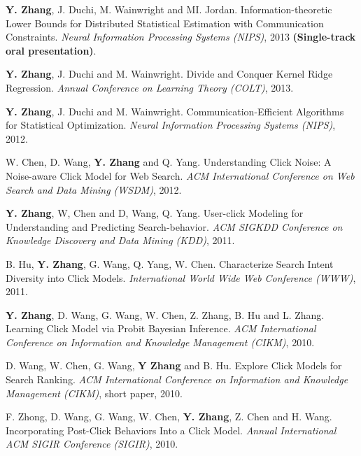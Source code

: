 \documentclass{res} %
\begin{document}
\begin{resume}
\begin{enumerate}[label={[C\arabic*]}, ref={C\arabic*}]
\item \textbf{Y. Zhang}, J. Duchi, M. Wainwright and MI. Jordan. Information-theoretic Lower Bounds for Distributed Statistical Estimation with Communication Constraints.
\emph{Neural Information Processing Systems (NIPS)}, 2013 {\bf (Single-track oral presentation)}. \label{information-nips13}

\item  \textbf{Y. Zhang}, J. Duchi and M. Wainwright. Divide and Conquer Kernel Ridge Regression.
\emph{Annual Conference on Learning Theory (COLT)}, 2013. \label{divide-colt13}

\item  \textbf{Y. Zhang}, J. Duchi and M. Wainwright. Communication-Efficient Algorithms for Statistical Optimization.
\emph{Neural Information Processing Systems (NIPS)}, 2012. \label{communication-nips12}

\item  W. Chen, D. Wang, \textbf{Y. Zhang} and Q. Yang. Understanding Click Noise: A Noise-aware Click Model for Web Search.
\emph{ACM International Conference on Web Search and Data Mining (WSDM)}, 2012. \label{understanding-wsdm12}

\item  \textbf{Y. Zhang}, W, Chen and D, Wang, Q. Yang. User-click Modeling for Understanding and Predicting Search-behavior.
\emph{ACM SIGKDD Conference on Knowledge Discovery and Data Mining (KDD)}, 2011.\label{user-kdd11}
\item B. Hu, \textbf{Y. Zhang}, G. Wang, Q. Yang, W. Chen. Characterize Search Intent Diversity into Click Models.
\emph{International World Wide Web Conference (WWW)}, 2011. \label{characterize-www11}

\item \textbf{Y. Zhang}, D. Wang, G. Wang, W. Chen, Z. Zhang, B. Hu and L. Zhang. Learning Click Model via Probit Bayesian Inference.
\emph{ACM International Conference on Information and Knowledge Management (CIKM)}, 2010. \label{learning-cikm10}

\item D. Wang, W. Chen, G. Wang, \textbf{Y Zhang} and B. Hu. Explore Click Models for Search Ranking.
\emph{ACM International Conference on Information and Knowledge Management (CIKM)}, short paper, 2010. \label{explore-cikm10}

\item F. Zhong, D. Wang, G. Wang, W. Chen, \textbf{Y. Zhang}, Z. Chen and H. Wang. Incorporating Post-Click Behaviors Into a Click Model.
\emph{Annual International ACM SIGIR Conference (SIGIR)}, 2010. \label{incorporating-sigir10}


\end{enumerate}
\end{resume}
\end{document}
